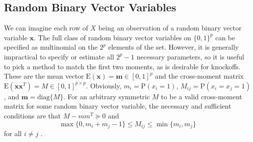 \documentclass[11pt]{article}
\newcommand{\p}{\mathrm{P}}
\newcommand{\E}{\mathrm{E}}
\newcommand{\diag}[1]{\mathrm{diag}\{#1\}}
\theoremstyle{definition}
\begin{document}
\subsection{Random Binary Vector Variables}
We can imagine each row of $X$ being an observation of a random binary vector variable $\mathbf x$. The full class of random binary vector variables on $\{0,1\}^p$ can be specified as multinomial on the $2^p$ elements of the set. However, it is generally impractical to specify or estimate all $2^p-1$ necessary parameters, so it is useful to pick a method to match the first two moments, as is desirable for knockoffs. These are the mean vector $\E(\mathbf x)=\mathbf{m}\in[0,1]^p$ and the cross-moment matrix $\E(\mathbf x\mathbf x^T)=M\in[0,1]^{p\times p}$. Obviously, $m_i = \p(x_i=1)$, $M_{ij} = \p(x_i=x_j=1)$, and $\mathbf m=\diag{M}$. For an arbitrary symmetric $M$ to be a valid cross-moment matrix for some random binary vector variable, the necessary and sufficient conditions are that $M-mm^T\succeq0$ and
    \[ \max\{0,m_i+m_j -1\} \leq M_{ij} \leq \min\{m_i,m_j\}\]
    for all $i\neq j$ \cite{2011arXiv1111.0576S}.
\end{document}
